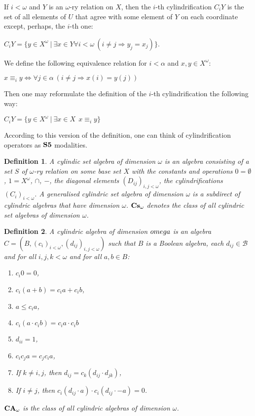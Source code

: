 \documentclass{article}
\theoremstyle{defin}
\newtheorem{definition}{Definition}
\theoremstyle{theorem}
\theoremstyle{claim}
\theoremstyle{prop}
\theoremstyle{lemma}
\theoremstyle{fact}
\theoremstyle{remark}
\theoremstyle{ex}
\theoremstyle{col}
\theoremstyle{question}
\begin{document}
If $i < \omega$ and $Y$ is an $\omega$-ry relation on $X$, then
the $i$-th cylindrification $C_i Y$ is the set of all elements of $U$ that agree with some element of $Y$ 
on each coordinate except, perhaps, the $i$-th one:
\begin{center}
$C_i Y = \{ y \in X^{\omega} \: |
\: \exists x \in Y \forall i < \omega \: (i \neq j \Rightarrow y_j = x_j)\}$.
\end{center}
We define the following equivalence relation for $i < \alpha$ and $x, y \in X^{\omega}$:
\begin{center}
 $x \equiv_i y \Leftrightarrow \forall j \in \alpha \: (i \neq j \Rightarrow x(i) = y(j))$
\end{center}
Then one may reformulate the definition of the $i$-th cylindrification the following way:

\begin{center}
 $C_i Y = \{ y \in X^{\omega} \: | \: \exists x \in X \:\: x \equiv_i y \}$
\end{center}

According to this version of the definition, one can think of cylindrification operators as ${\bf S5}$ modalities.

\begin{definition}
 A cylindic set algebra of dimension $\omega$ is an algebra consisting of a set $S$ of $\omega$-ry 
 relation on some base set $X$ with the constants and operations $0 = \emptyset$, $1 = X^{\omega}$, 
 $\cap$, $-$, the diagonal elements ${(D_{ij})}_{i, j < \omega}$, 
 the cylindrifications ${(C_i)}_{i < \omega}$. 
 A \emph{generalised cylindric set algebra of dimension $\omega$} is a subdirect of cylindric algebras
 that have dimension $\omega$.
  ${\bf Cs}_{\omega}$ denotes the class of all cylindric set algebras of dimension $\omega$.
\end{definition}

\begin{definition}
   A cylindric algebra of dimension $\\omega$ is an algebra $C = (B,  {(c_i)}_{i < \omega}, {(d_{ij})}_{i, j < \omega})$ 
   such that $B$ is a Boolean algebra, each $d_{ij} \in \mathcal{B}$ and for all $i, j, k < \omega$ and for all $a, b \in B$:
   \begin{enumerate}
     \item $c_i 0 = 0$,
     \item $c_i (a + b) = c_i a + c_i b$,
     \item $a \leq c_i a$,
     \item $c_i (a \cdot c_i b) = c_i a \cdot c_i b$
     \item $d_{ii} = 1$,
     \item $c_i c_j a = c_j c_i a$,
     \item If $k \neq i, j$, then $d_{ij} = c_k (d_{ij} \cdot d_{jk})$,
     \item If $i \neq j$, then $c_i (d_{ij} \cdot a) \cdot c_i (d_{ij} \cdot - a) = 0$.
   \end{enumerate}
   ${\bf CA}_{\omega}$ is the class of all cylindric algebras of dimension $\omega$.
\end{definition}
\end{document}
